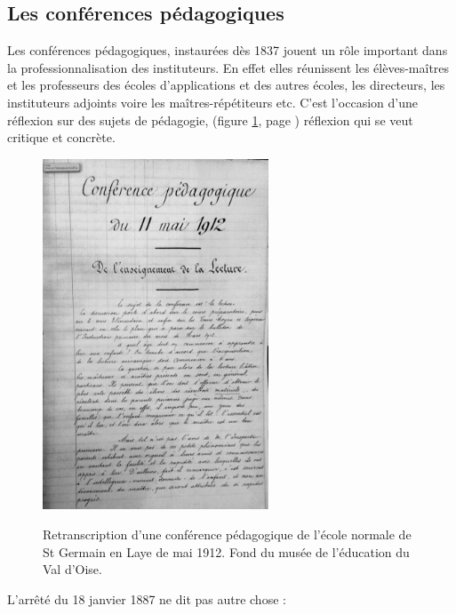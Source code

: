 \documentclass[a4paper,11pt]{article}
\begin{document}
			\subsection{Les conférences pédagogiques}
			Les conférences pédagogiques, instaurées dès 1837 jouent un rôle important dans la professionnalisation des instituteurs. En effet elles réunissent les élèves-maîtres et les professeurs des écoles d'applications et des autres écoles, les directeurs, les instituteurs adjoints voire les maîtres-répétiteurs etc. C'est l'occasion d'une réflexion sur des sujets de pédagogie, (figure \ref{fig. 4}, page \pageref{fig. 4}) réflexion qui se veut critique et concrète.
			  \begin{figure}[!h]
			    \centering
			    \includegraphics[width=0.6\textwidth]{conf01.png}\\
			    \caption{Retranscription d'une conférence pédagogique de l'école normale de St Germain en Laye de mai 1912. Fond du musée de l'éducation du Val d'Oise.}
			    \label{fig. 4}
			  \end{figure}
			  L'arrêté du 18 janvier 1887 ne dit pas autre chose :
\end{document}
